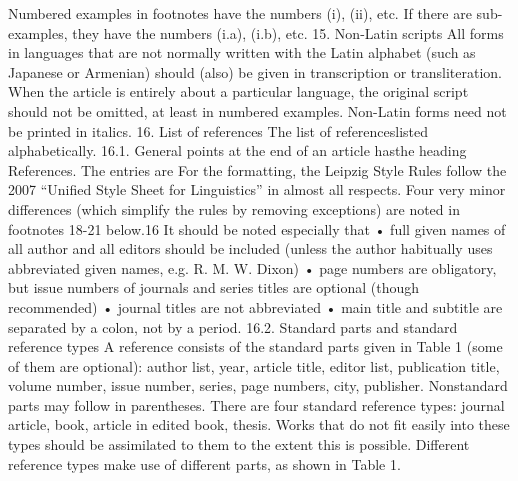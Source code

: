 Numbered examples in footnotes have the numbers (i), (ii), etc. If there are sub-
examples, they have the numbers (i.a), (i.b), etc.
15. Non-Latin scripts
All forms in languages that are not normally written with the Latin alphabet (such as
Japanese or Armenian) should (also) be given in transcription or transliteration.
When the article is entirely about a particular language, the original script should not be
omitted, at least in numbered examples.
Non-Latin forms need not be printed in italics.
16. List of references
The list of referenceslisted alphabetically.
16.1. General points
at the end of an article hasthe heading References. The entries are
For the formatting, the Leipzig Style Rules follow the 2007 “Unified Style Sheet for
Linguistics” in almost all respects. Four very minor differences (which simplify the rules by
removing exceptions) are noted in footnotes 18-21 below.16
It should be noted especially that
• full given names of all author and all editors should be included (unless the author
habitually uses abbreviated given names, e.g. R. M. W. Dixon)
• page numbers are obligatory, but issue numbers of journals and series titles are optional
(though recommended)
• journal titles are not abbreviated
• main title and subtitle are separated by a colon, not by a period.
16.2. Standard parts and standard reference types
A reference consists of the standard parts given in Table 1 (some of them are optional):
author list, year, article title, editor list, publication title, volume number, issue number,
series, page numbers, city, publisher. Nonstandard parts may follow in parentheses.
There are four standard reference types: journal article, book, article in edited book,
thesis. Works that do not fit easily into these types should be assimilated to them to the
extent this is possible. Different reference types make use of different parts, as shown in
Table 1.
	
 	
 	
 	
 	
 	
 	
 	
 	
 	
 	
 	
 	
 	
 	
 	
 	
 	
 	
 	
 	
 	
 	
 	
 	
 	
 	
 	
 	
 	
 	
